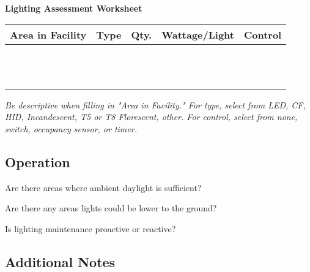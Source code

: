 \documentclass[./main.tex]{subfiles}
\begin{document}
\begin{center}
    \Large{\textbf{Lighting Assessment Worksheet}}
\end{center}



\begin{table}[h!]
\centering
\begin{tabular}{|p{6.25cm}|p{2cm}|c|c|p{2cm}|}
\hline
Area in Facility & Type & Qty. & Wattage/Light & Control\\
\hline
 & & & & \\[1cm]
\hline
 & & & & \\[1cm]
\hline
 & & & & \\[1cm]
\hline
 & & & & \\[1cm]
\hline
 & & & & \\[1cm]
\hline
 & & & & \\[1cm]
\hline
 & & & & \\[1cm]
\hline
 & & & & \\[1cm]
\hline
 & & & & \\[1cm]
\hline
 & & & & \\[1cm]
\hline
 & & & & \\[1cm]
\hline
 & & & & \\[1cm]
\hline


\end{tabular}
\end{table}

\noindent \emph{Be descriptive when filling in "Area in Facility." For type, select from LED, CF, HID, Incandescent, T5 or T8 Florescent, other. For control, select from none, switch, occupancy sensor, or timer.}

\clearpage


\subsection*{Operation}

\noindent Are there areas where ambient daylight is sufficient?
\vspace{2cm}

\noindent Are there any areas lights could be lower to the ground? 
\vspace{2cm}

\noindent Is lighting maintenance proactive or reactive?
\vspace{2cm}

\subsection*{Additional Notes}
\end{document}
